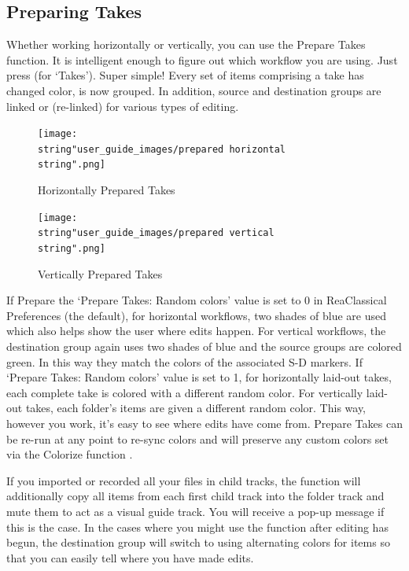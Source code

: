 \documentclass[10pt,american]{article}
\begin{document}
\subsection{Preparing Takes}

Whether working horizontally or vertically, you can use the Prepare Takes
function. It is intelligent enough to figure out which workflow you are using.
Just press  (for `Takes'). Super simple! Every set of items comprising a
take has changed color, is now grouped. In addition, source and destination
groups are linked or (re-linked) for various types of editing. 

\begin{figure}
\texttt{[image: \\string"user\_guide\_images/prepared horizontal\\string".png]}

\caption{Horizontally Prepared Takes}

\end{figure}

\begin{figure}
\texttt{[image: \\string"user\_guide\_images/prepared vertical\\string".png]}

\caption{Vertically Prepared Takes}

\end{figure}

If Prepare the `Prepare Takes: Random colors' value is set to 0 in ReaClassical
Preferences  (the default), for horizontal workflows, two shades of
blue are used which also helps show the user where edits happen. For vertical
workflows, the destination group again uses two shades of blue and the source
groups are colored green. In this way they match the colors of the associated
S-D markers. If `Prepare Takes: Random colors' value is set to 1, for
horizontally laid-out takes, each complete take is colored with a different
random color. For vertically laid-out takes, each folder's items are given a
different random color. This way, however you work, it's easy to see where edits
have come from. Prepare Takes can be re-run at any point to re-sync colors and
will preserve any custom colors set via the Colorize function .

If you imported or recorded all your files in child tracks, the function will
additionally copy all items from each first child track into the folder track
and mute them to act as a visual guide track. You will receive a pop-up message
if this is the case. In the cases where you might use the function after editing
has begun, the destination group will switch to using alternating colors for
items so that you can easily tell where you have made edits.
\end{document}
